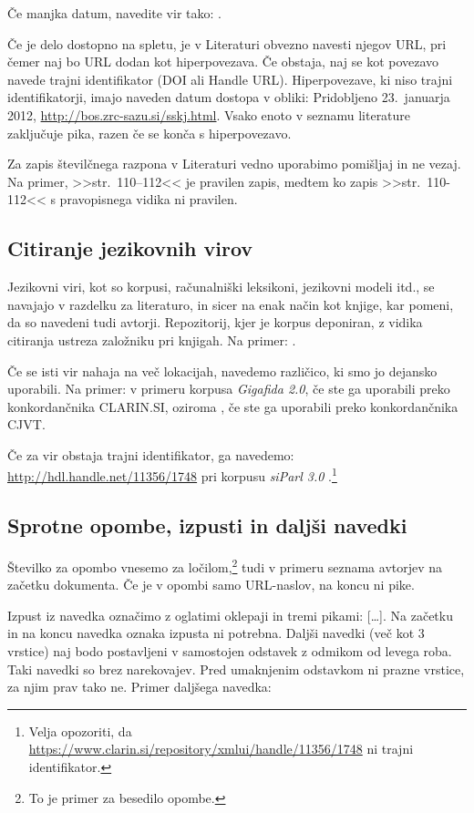\documentclass{article}
\begin{document}
Če manjka datum, navedite vir tako: \parencite{slobench-ner}.

Če je delo dostopno na spletu, je v Literaturi obvezno navesti njegov URL, pri čemer naj bo URL dodan kot hiperpovezava. Če obstaja, naj se kot povezavo navede trajni identifikator (DOI ali Handle URL). Hiperpovezave, ki niso trajni identifikatorji, imajo naveden datum dostopa v obliki: Pridobljeno 23.\ januarja 2012, \url{http://bos.zrc-sazu.si/sskj.html}. Vsako enoto v seznamu literature zaključuje pika, razen če se konča s hiperpovezavo.

Za zapis številčnega razpona v Literaturi vedno uporabimo pomišljaj in ne vezaj. Na primer, >>str.\ 110--112<< je pravilen zapis, medtem ko zapis >>str.\ 110-112<< s pravopisnega vidika ni pravilen. 

\subsection{Citiranje jezikovnih virov}

Jezikovni viri, kot so korpusi, računalniški leksikoni, jezikovni modeli itd., se navajajo v razdelku za literaturo, in sicer na enak način kot knjige, kar pomeni, da so navedeni tudi avtorji. Repozitorij, kjer je korpus deponiran, z vidika citiranja ustreza založniku pri knjigah. Na primer: \textcite{parliamentaryCorpus}. 

Če se isti vir nahaja na več lokacijah, navedemo različico, ki smo jo dejansko uporabili. Na primer: \parencite{gigafida-clarin} v primeru korpusa \textit{Gigafida 2.0}, če ste ga uporabili preko konkordančnika CLARIN.SI, oziroma \parencite{gigafida-cjvt}, če ste ga uporabili preko konkordančnika CJVT.

Če za vir obstaja trajni identifikator, ga navedemo: \url{http://hdl.handle.net/11356/1748} pri korpusu \textit{siParl 3.0} \parencite{parliamentaryCorpus}.\footnote{Velja opozoriti, da \url{https://www.clarin.si/repository/xmlui/handle/11356/1748} ni trajni identifikator.}

\subsection{Sprotne opombe, izpusti in daljši navedki}

Številko za opombo vnesemo za ločilom,\footnote{To je primer za besedilo opombe.} tudi v primeru seznama avtorjev na začetku dokumenta. Če je v opombi samo URL-naslov, na koncu ni pike.

Izpust iz navedka označimo z oglatimi oklepaji in tremi pikami: [\ldots]. Na začetku in na koncu navedka oznaka izpusta ni potrebna. Daljši navedki (več kot 3 vrstice) naj bodo postavljeni v samostojen odstavek z odmikom od levega roba. Taki navedki so brez narekovajev. Pred umaknjenim odstavkom ni prazne vrstice, za njim prav tako ne. Primer daljšega navedka:
\end{document}
